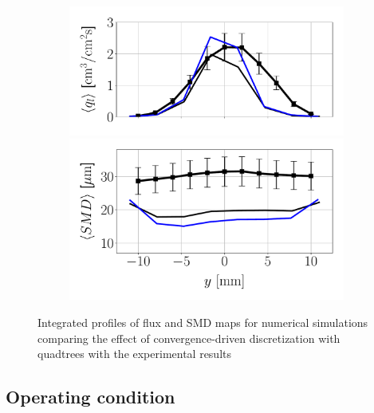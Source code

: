 \begin{figure}[ht]
\begin{subfigure}[b]{0.4\textwidth}
	\flushleft
   \includegraphics[scale=0.35]{./part2_developments/figures_ch6_lagrangian_JICF/params_quadtrees/profiles/flux_along_y}\\
   \vspace{-0.16in}
   \includegraphics[scale=0.35]{./part2_developments/figures_ch6_lagrangian_JICF/params_quadtrees/profiles/SMD_along_y}
\end{subfigure}

\caption{Integrated profiles of flux and SMD maps for numerical simulations comparing the effect of convergence-driven discretization with quadtrees with the experimental results}
\label{fig:profiles_LGS_JICF_quadtrees}
\end{figure}



\subsection{Operating condition}
\label{subsec:JICF_LGS_params_OP}

